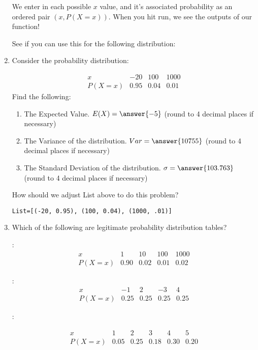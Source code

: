 \documentclass{ximera}
\begin{document}
\begin{enumerate}
We enter in each possible $x$ value, and it's associated probability as an ordered pair $(x, P(X=x))$.  When you hit run, we see the outputs of our function!

See if you can use this for the following distribution:

\item Consider the probability distribution:

$$\begin{array}{c|ccc}
x & -20 &  100 & 1000\\
\hline
P(X=x) & 0.95 & 0.04  & 0.01
\end{array}$$
Find the following:

\begin{enumerate}
\item The Expected Value.  $E(X)=\answer{-5}$ (round to 4 decimal places if necessary)
\item The Variance of the distribution.  $Var=\answer{10755}$ (round to 4 decimal places if necessary)
\item The Standard Deviation of the distribution. $\sigma=\answer{103.763}$  (round to 4 decimal places if necessary)
\end{enumerate}

How should we adjust List above to do this problem?

\begin{hint}
\begin{verbatim}
List=[(-20, 0.95), (100, 0.04), (1000, .01)]
\end{verbatim}
\end{hint}

\item Which of the following are legitimate probability distribution tables?

\begin{selectAll}
\choice[correct]:
$$\begin{array}{c|cccc}
x & 1 & 10 &  100 & 1000\\
\hline
P(X=x) & 0.90 & 0.02  & 0.01 & 0.02
\end{array}$$

\choice[correct]:
$$\begin{array}{c|cccc}
x & -1 & 2 &  -3 & 4\\
\hline
P(X=x) & 0.25 & 0.25  & 0.25 & 0.25
\end{array}$$

\choice:

$$\begin{array}{c|ccccc}
x & 1 & 2 &  3 & 4 & 5\\
\hline
P(X=x) & 0.05 & 0.25  & 0.18 & 0.30 & 0.20
\end{array}$$




\end{selectAll}
\end{enumerate}
\end{document}
